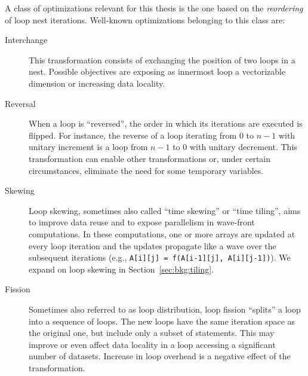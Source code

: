 A class of optimizations relevant for this thesis is the one based on the {\em reordering} of loop nest iterations. Well-known optimizations belonging to this class are:

\begin{description}
\item[Interchange] This transformation consists of exchanging the position of two loops in a nest. Possible objectives are exposing as innermost loop a vectorizable dimension or increasing data locality. 
\item[Reversal] When a loop is ``reversed'', the order in which its iterations are executed is flipped. For instance, the reverse of a loop iterating from $0$ to $n-1$ with unitary increment is a loop from $n-1$ to $0$ with unitary decrement. This transformation can enable other transformations or, under certain circumstances, eliminate the need for some temporary variables.
\item[Skewing] Loop skewing, sometimes also called ``time skewing'' or ``time tiling'', aims to improve data reuse and to expose parallelism in wave-front computations. In these computations, one or more arrays are updated at every loop iteration and the updates propagate like a wave over the subsequent iterations (e.g., \texttt{A[i][j] = f(A[i-1][j], A[i][j-1])}). We expand on loop skewing in Section~\ref{sec:bkg:tiling}.
\item[Fission] Sometimes also referred to as loop distribution, loop fission ``splits'' a loop into a sequence of loops. The new loops have the same iteration space as the original one, but include only a subset of statements. This may improve or even affect data locality in a loop accessing a significant number of datasets. Increase in loop overhead is a negative effect of the transformation.
\end{description}

